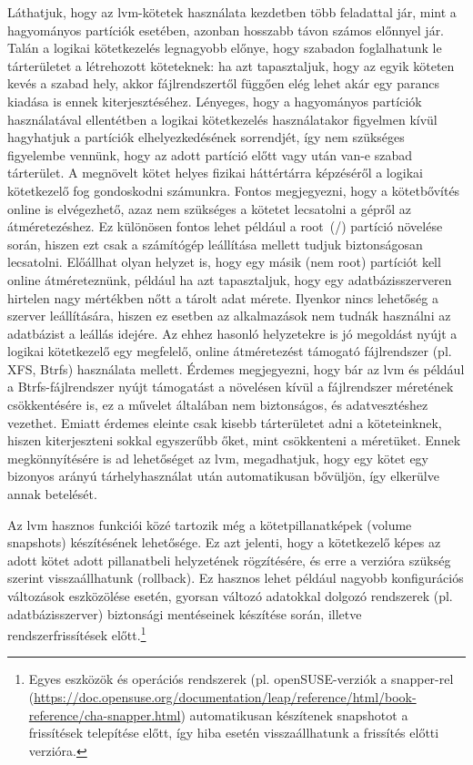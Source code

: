Láthatjuk, hogy az \acrshort{lvm}-kötetek használata kezdetben több feladattal jár, mint a hagyományos partíciók esetében, azonban hosszabb távon számos előnnyel jár. Talán a logikai kötetkezelés legnagyobb előnye, hogy szabadon foglalhatunk le tárterületet a létrehozott köteteknek: ha azt tapasztaljuk, hogy az egyik köteten kevés a szabad hely, akkor fájlrendszertől függően elég lehet akár egy parancs kiadása is ennek kiterjesztéséhez. Lényeges, hogy a hagyományos partíciók használatával ellentétben a logikai kötetkezelés használatakor figyelmen kívül hagyhatjuk a partíciók elhelyezkedésének sorrendjét, így nem szükséges figyelembe vennünk, hogy az adott partíció előtt vagy után van-e szabad tárterület. A megnövelt kötet helyes fizikai háttértárra képzéséről a logikai kötetkezelő fog gondoskodni számunkra. Fontos megjegyezni, hogy a kötetbővítés online is elvégezhető, azaz nem szükséges a kötetet lecsatolni a gépről az átméretezéshez. Ez különösen fontos lehet például a root~(/) partíció növelése során, hiszen ezt csak a számítógép leállítása mellett tudjuk biztonságosan lecsatolni. Előállhat olyan helyzet is, hogy egy másik (nem root) partíciót kell online átméreteznünk, például ha azt tapasztaljuk, hogy egy adatbázisszerveren hirtelen nagy mértékben nőtt a tárolt adat mérete. Ilyenkor nincs lehetőség a szerver leállítására, hiszen ez esetben az alkalmazások nem tudnák használni az adatbázist a leállás idejére. Az ehhez hasonló helyzetekre is jó megoldást nyújt a logikai kötetkezelő egy megfelelő, online átméretezést támogató fájlrendszer (pl. XFS, Btrfs) használata mellett. Érdemes megjegyezni, hogy bár az \acrshort{lvm} és például a Btrfs-fájlrendszer nyújt támogatást a növelésen kívül a fájlrendszer méretének csökkentésére is, ez a művelet általában nem biztonságos, és adatvesztéshez vezethet. Emiatt érdemes eleinte csak kisebb tárterületet adni a köteteinknek, hiszen kiterjeszteni sokkal egyszerűbb őket, mint csökkenteni a méretüket. Ennek megkönnyítésére is ad lehetőséget az \acrshort{lvm}, megadhatjuk, hogy egy kötet egy bizonyos arányú tárhelyhasználat után automatikusan bővüljön, így elkerülve annak betelését.

Az \acrshort{lvm} hasznos funkciói közé tartozik még a kötetpillanatképek (volume snapshots) készítésének lehetősége. Ez azt jelenti, hogy a kötetkezelő képes az adott kötet adott pillanatbeli helyzetének rögzítésére, és erre a verzióra szükség szerint visszaállhatunk (rollback). Ez hasznos lehet például nagyobb konfigurációs változások eszközölése esetén, gyorsan változó adatokkal dolgozó rendszerek (pl. adatbázisszerver) biztonsági mentéseinek készítése során, illetve rendszerfrissítések előtt.\footnote{Egyes eszközök és operációs rendszerek (pl. openSUSE-verziók a snapper-rel (\url{https://doc.opensuse.org/documentation/leap/reference/html/book-reference/cha-snapper.html}) automatikusan készítenek snapshotot a frissítések telepítése előtt, így hiba esetén visszaállhatunk a frissítés előtti verzióra.}


